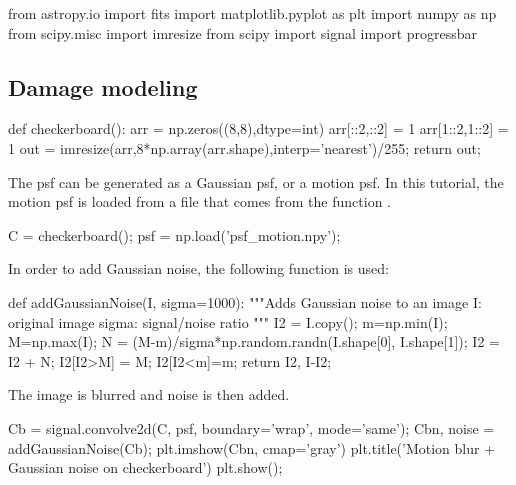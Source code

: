 \def\QRCODE{TB_image_TUT.IMG.image_restoration_deblurring_pythonqrcode.png}
\def\QRPAGE{http://www.iptutorials.science/tree/master/TB_image/TUT.IMG.image_restoration_deblurring/python}

\begin{python}
from astropy.io import fits
import matplotlib.pyplot as plt
import numpy as np
from scipy.misc import imresize
from scipy import signal
import progressbar
\end{python}

\vspace*{-3pt}

\subsection{Damage modeling}

\begin{python}
def checkerboard():
    arr = np.zeros((8,8),dtype=int)
    arr[::2,::2] = 1
    arr[1::2,1::2] = 1
    out = imresize(arr,8*np.array(arr.shape),interp='nearest')/255;
    return out;
\end{python}

The psf can be generated as a Gaussian psf, or a motion psf. In this tutorial, the motion psf is loaded from a file that comes from the \matlabregistered{} function .%
\begin{python}
C = checkerboard();
psf = np.load('psf_motion.npy');
\end{python}

In order to add Gaussian noise, the following function is used:
\begin{python}    
def addGaussianNoise(I, sigma=1000):
    """Adds Gaussian noise to an image
    I: original image
    sigma: signal/noise ratio
    """
    I2 = I.copy();
    m=np.min(I);
    M=np.max(I);
    N = (M-m)/sigma*np.random.randn(I.shape[0], I.shape[1]);
    I2 = I2 + N;
    I2[I2>M] = M;
    I2[I2<m]=m;
    return I2, I-I2;
\end{python}

The image is blurred and noise is then added.
\begin{python}
Cb = signal.convolve2d(C, psf, boundary='wrap', mode='same');
Cbn, noise = addGaussianNoise(Cb);
plt.imshow(Cbn, cmap='gray')
plt.title('Motion blur + Gaussian noise on checkerboard')
plt.show();
\end{python}

